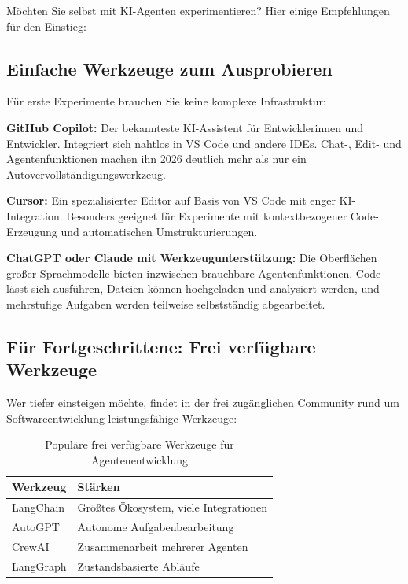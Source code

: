 Möchten Sie selbst mit KI-Agenten experimentieren? Hier einige Empfehlungen für den Einstieg:

\subsection{Einfache Werkzeuge zum Ausprobieren}

Für erste Experimente brauchen Sie keine komplexe Infrastruktur:

\textbf{GitHub Copilot:} Der bekannteste KI-Assistent für Entwicklerinnen und Entwickler. Integriert sich nahtlos in VS Code und andere IDEs. Chat-, Edit- und Agentenfunktionen machen ihn 2026 deutlich mehr als nur ein Autovervollständigungswerkzeug.~\cite{github2026copilot}

\textbf{Cursor:} Ein spezialisierter Editor auf Basis von VS Code mit enger KI-Integration. Besonders geeignet für Experimente mit kontextbezogener Code-Erzeugung und automatischen Umstrukturierungen.

\textbf{ChatGPT oder Claude mit Werkzeugunterstützung:} Die Oberflächen großer Sprachmodelle bieten inzwischen brauchbare Agentenfunktionen. Code lässt sich ausführen, Dateien können hochgeladen und analysiert werden, und mehrstufige Aufgaben werden teilweise selbstständig abgearbeitet.

\subsection{Für Fortgeschrittene: Frei verfügbare Werkzeuge}

Wer tiefer einsteigen möchte, findet in der frei zugänglichen Community rund um Softwareentwicklung leistungsfähige Werkzeuge:

\begin{table}[ht]
\centering
\small
\begin{tabularx}{\columnwidth}{@{}l Y@{}}
\toprule
\textbf{Werkzeug} & \textbf{Stärken} \\
\midrule
LangChain & Größtes Ökosystem, viele Integrationen \\
AutoGPT & Autonome Aufgabenbearbeitung \\
CrewAI & Zusammenarbeit mehrerer Agenten \\
LangGraph & Zustandsbasierte Abläufe \\
\bottomrule
\end{tabularx}
\caption{Populäre frei verfügbare Werkzeuge für Agentenentwicklung}
\label{tab:frameworks}
\end{table}

